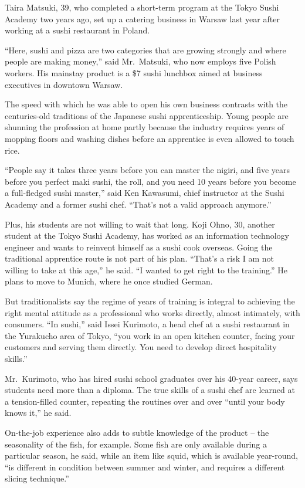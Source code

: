 ﻿\documentclass[12pt]{article}
\begin{document}
Taira Matsuki, 39, who completed a short-term program at the Tokyo Sushi Academy two years ago, set
up a catering business in Warsaw last year after working at a sushi restaurant in Poland.

``Here, sushi and pizza are two categories that are growing strongly and where people are making
money,'' said Mr.~Matsuki, who now employs five Polish workers. His mainstay product is a \$7 sushi
lunchbox aimed at business executives in downtown Warsaw.

The speed with which he was able to open his own business contrasts with the centuries-old
traditions of the Japanese sushi apprenticeship. Young people are shunning the profession at home
partly because the industry requires years of mopping floors and washing dishes before an apprentice
is even allowed to touch rice.

``People say it takes three years before you can master the nigiri, and five years before you
perfect maki sushi, the roll, and you need 10 years before you become a full-fledged sushi master,''
said Ken Kawasumi, chief instructor at the Sushi Academy and a former sushi chef. ``That's not a
valid approach anymore.''

Plus, his students are not willing to wait that long. Koji Ohno, 30, another student at the Tokyo
Sushi Academy, has worked as an information technology engineer and wants to reinvent himself as a
sushi cook overseas. Going the traditional apprentice route is not part of his plan. ``That's a risk
I am not willing to take at this age,'' he said. ``I wanted to get right to the training.'' He plans
to move to Munich, where he once studied German.

But traditionalists say the regime of years of training is integral to achieving the right mental
attitude as a professional who works directly, almost intimately, with consumers. ``In sushi,'' said
Issei Kurimoto, a head chef at a sushi restaurant in the Yurakucho area of Tokyo, ``you work in an
open kitchen counter, facing your customers and serving them directly. You need to develop direct
hospitality skills.''

Mr.~Kurimoto, who has hired sushi school graduates over his 40-year career, says students need more
than a diploma. The true skills of a sushi chef are learned at a tension-filled counter, repeating
the routines over and over ``until your body knows it,'' he said.

On-the-job experience also adds to subtle knowledge of the product -- the seasonality of the fish,
for example. Some fish are only available during a particular season, he said, while an item like
squid, which is available year-round, ``is different in condition between summer and winter, and
requires a different slicing technique.''
\end{document}
